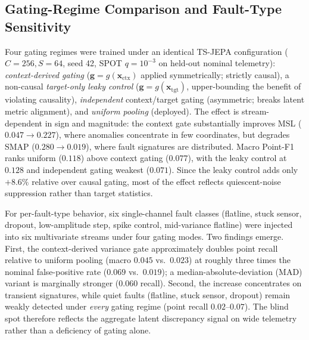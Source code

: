 \subsection{Gating-Regime Comparison and Fault-Type Sensitivity}
\label{subsec:gate_fault_study}
Four gating regimes were trained under an identical TS-JEPA configuration ($C{=}256, S{=}64$, seed 42, SPOT $q{=}10^{-3}$ on held-out nominal telemetry): \emph{context-derived gating} ($\mathbf{g} = g(\mathbf{x}_{\text{ctx}})$ applied symmetrically; strictly causal), a non-causal \emph{target-only leaky control} ($\mathbf{g} = g(\mathbf{x}_{\text{tgt}})$, upper-bounding the benefit of violating causality), \emph{independent} context/target gating (asymmetric; breaks latent metric alignment), and \emph{uniform pooling} (deployed). The effect is stream-dependent in sign and magnitude: the context gate substantially improves MSL ($0.047 \to 0.227$), where anomalies concentrate in few coordinates, but degrades SMAP ($0.280 \to 0.019$), where fault signatures are distributed. Macro Point-F1 ranks uniform ($0.118$) above context gating ($0.077$), with the leaky control at $0.128$ and independent gating weakest ($0.071$). Since the leaky control adds only $+8.6\%$ relative over causal gating, most of the effect reflects quiescent-noise suppression rather than target statistics.

For per-fault-type behavior, six single-channel fault classes (flatline, stuck sensor, dropout, low-amplitude step, spike control, mid-variance flatline) were injected into six multivariate streams under four gating modes. Two findings emerge. First, the context-derived variance gate approximately doubles point recall relative to uniform pooling (macro $0.045$ vs.\ $0.023$) at roughly three times the nominal false-positive rate ($0.069$ vs.\ $0.019$); a median-absolute-deviation (MAD) variant is marginally stronger ($0.060$ recall). Second, the increase concentrates on transient signatures, while quiet faults (flatline, stuck sensor, dropout) remain weakly detected under \textit{every} gating regime (point recall $0.02\text{--}0.07$). The blind spot therefore reflects the aggregate latent discrepancy signal on wide telemetry rather than a deficiency of gating alone.

